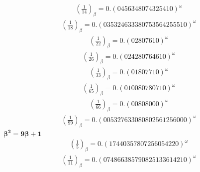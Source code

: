\documentclass[fleqn]{article}
\begin{document}
\begin{equation*}
\begin{split}
(\frac{1}{14})_\beta = 0.(0456348074325410)^\omega
\end{split}\end{equation*}
\begin{equation*}
\begin{split}
(\frac{1}{18})_\beta = 0.(035324633380753564255510)^\omega
\end{split}\end{equation*}
\begin{equation*}
\begin{split}
(\frac{1}{22})_\beta = 0.(02807610)^\omega
\end{split}\end{equation*}
\begin{equation*}
\begin{split}
(\frac{1}{26})_\beta = 0.(024280764610)^\omega
\end{split}\end{equation*}
\begin{equation*}
\begin{split}
(\frac{1}{33})_\beta = 0.(01807710)^\omega
\end{split}\end{equation*}
\begin{equation*}
\begin{split}
(\frac{1}{65})_\beta = 0.(010080780710)^\omega
\end{split}\end{equation*}
\begin{equation*}
\begin{split}
(\frac{1}{66})_\beta = 0.(00808000)^\omega
\end{split}\end{equation*}
\begin{equation*}
\begin{split}
(\frac{1}{99})_\beta = 0.(005327633080802561256000)^\omega
\end{split}\end{equation*}
$\boldsymbol{\beta^2 = 9\beta + 1}$
\begin{equation*}
\begin{split}
(\frac{1}{5})_\beta = 0.(17440357807256054220)^\omega
\end{split}\end{equation*}
\begin{equation*}
\begin{split}
(\frac{1}{11})_\beta = 0.(074866385790825133614210)^\omega
\end{split}\end{equation*}
\end{document}
